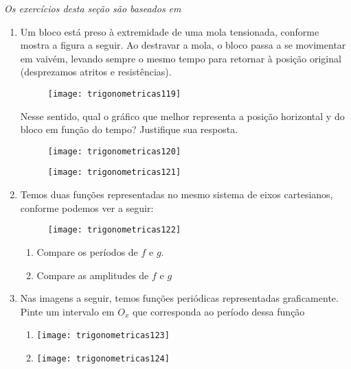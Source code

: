 \textit{Os exercícios desta seção são baseados em \cite{ignacio2002}}

\begin{enumerate}
\item Um bloco está preso à extremidade de uma mola tensionada, conforme mostra a figura a seguir. Ao destravar a mola, o bloco passa a se movimentar em vaivém, levando sempre o mesmo tempo para retornar à posição original (desprezamos atritos e resistências).

\begin{figure}[H]
\centering

\texttt{[image: trigonometricas119]}
\end{figure}

Nesse sentido, qual o gráfico que melhor representa a posição horizontal y do bloco em função do tempo? Justifique sua resposta.

\begin{figure}[H]
\centering

\texttt{[image: trigonometricas120]}
\end{figure}


\begin{figure}[H]
\centering

\texttt{[image: trigonometricas121]}
\end{figure}

\item Temos duas funções representadas no mesmo sistema de eixos cartesianos, conforme podemos ver a seguir:

\begin{figure}[H]
\centering

\texttt{[image: trigonometricas122]}
\end{figure}
\begin{enumerate}
\item Compare os períodos de $f$ e $g$.
\item Compare as amplitudes de $f$ e $g$
\end{enumerate}


\item Nas imagens a seguir, temos funções periódicas representadas graficamente. Pinte um intervalo em $O_x$ que corresponda ao período dessa função
\begin{enumerate}
\item {}
{
\texttt{[image: trigonometricas123]}
}
\item {}
{
\texttt{[image: trigonometricas124]}
}
\end{enumerate}



\end{enumerate}
